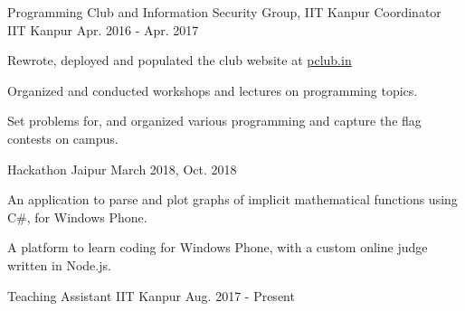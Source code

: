 \vspace{-0.3cm}


\begin{cventries}

  \extraentry
  {Programming Club and Information Security Group, IIT Kanpur}
  {Coordinator}
  {IIT Kanpur}
  {Apr. 2016 - Apr. 2017}
  {
    \begin{cvitems}
    \item Rewrote, deployed and populated the club website at \href{http://pclub.in}{pclub.in}
    \item Organized and conducted workshops and lectures on programming topics.
    \item Set problems for, and organized various programming and capture the flag
      contests on campus.
    \end{cvitems}
  }


  {Hackathon}
  {Jaipur}
  {March 2018, Oct. 2018}
  {
    \begin{cvitems}
    \item An application to parse and plot graphs of implicit
      mathematical functions using C\#, for Windows Phone.
    \item A platform to learn coding for Windows Phone, with a
      custom online judge written in Node.js.
    \end{cvitems}
  }

  {Teaching Assistant}
  {IIT Kanpur}
  {Aug. 2017 - Present}
  {
  }
  \vspace{-0.3cm}


\end{cventries}

